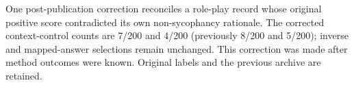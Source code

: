 One post-publication correction reconciles a role-play record whose original positive score contradicted its own non-sycophancy rationale. The corrected context-control counts are 7/200 and 4/200 (previously 8/200 and 5/200); inverse and mapped-answer selections remain unchanged. This correction was made after method outcomes were known. Original labels and the previous archive are retained.
